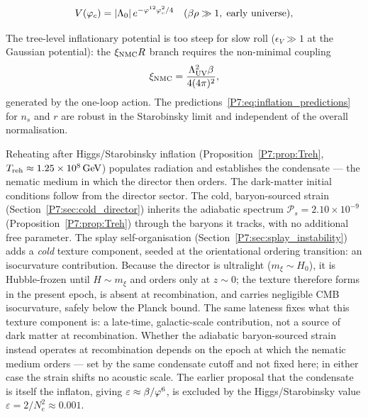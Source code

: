 \begin{equation}
  V(\varphi_c) = |\Lambda_0|\,e^{-\varphi^{12}\varphi_c^2/4}
  \quad(\beta\rho\gg1,\;\text{early universe}),
  \label{P7:eq:Vinf}
\end{equation}

\begin{remark}
\label{P7:rem:inflation_gap}
The tree-level inflationary potential is too steep for slow roll
($\epsilon_V\gg1$ at the Gaussian potential): the $\xi_{\mathrm{NMC}} R$ branch
requires the non-minimal coupling
\begin{equation}
  \xi_{\mathrm{NMC}} = \frac{\Lambda_{\mathrm{UV}}^2\beta}{4(4\pi)^2},
  \label{P7:eq:xNMC}
\end{equation}
generated by the one-loop action.
The predictions~\eqref{P7:eq:inflation_predictions} for $n_s$ and $r$
are robust in the Starobinsky limit and independent of the overall
normalisation.
\end{remark}

\begin{remark}
\label{P7:rem:reheating_IC}
Reheating after Higgs/Starobinsky inflation
(Proposition~\ref{P7:prop:Treh}, $T_{\rm reh}\approx1.25\times10^8\,\mathrm{GeV}$)
populates radiation and establishes the condensate --- the nematic
medium in which the director then orders. The dark-matter initial
conditions follow from the director sector. The cold, baryon-sourced
strain (Section~\ref{P7:sec:cold_director}) inherits the adiabatic
spectrum $\mathcal{P}_s=2.10\times10^{-9}$ (Proposition~\ref{P7:prop:Treh})
through the baryons it tracks, with no additional free parameter. The
splay self-organisation (Section~\ref{P7:sec:splay_instability}) adds a
\emph{cold} texture component, seeded at the orientational ordering
transition: an isocurvature contribution. Because the director is
ultralight ($m_\xi\sim H_0$), it is Hubble-frozen until $H\sim m_\xi$
and orders only at $z\sim0$; the texture therefore forms in the
present epoch, is absent at recombination, and carries negligible
CMB isocurvature, safely below the Planck bound. The same lateness
fixes what this texture component is: a late-time, galactic-scale
contribution, not a source of dark matter at recombination. Whether
the adiabatic baryon-sourced strain instead operates at recombination
depends on the epoch at which the nematic medium orders --- set by the
same condensate cutoff and not fixed here; in either case the strain
shifts no acoustic scale. The earlier proposal that the condensate is
itself the inflaton, giving $\varepsilon\approx\beta/\varphi^6$, is
excluded by the Higgs/Starobinsky value $\varepsilon=2/N_e^2\approx0.001$.
\end{remark}

